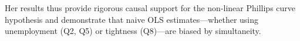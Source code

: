 \documentclass[dvipsnames,11pt]{article}
\begin{document}
\begin{enumerate}[resume]
\begin{solution}
                    Her results thus provide rigorous causal support for the non-linear Phillips curve hypothesis and demonstrate that naive OLS estimates---whether using unemployment (Q2, Q5) or tightness (Q8)---are biased by simultaneity.
                    
                \end{solution}
                
        \end{enumerate}


    

\printbibliography
\end{document}
